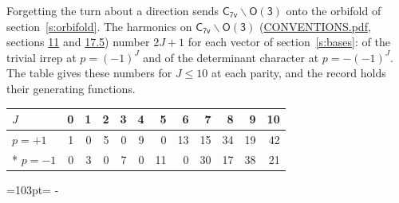 \documentclass[10pt,a4paper]{article}
\newcommand{\needspace}[1]{\par\penalty-100\begingroup\dimen0=#1\relax\dimen2=\pagegoal
  \advance\dimen2-\pagetotal\ifdim\dimen0>\dimen2\relax\ifdim\dimen2>0pt\vfil\break\fi\fi
  \endgroup}
\numberwithin{equation}{section}
\newcommand{\grp}[1]{\mathsf{#1}}
\begin{document}
Forgetting the turn about a direction sends $\grp{C_{7v}}\backslash\grp{O(3)}$ onto the orbifold of section~\ref{s:orbifold}.
The harmonics on $\grp{C_{7v}}\backslash\grp{O(3)}$ (\href{../../CONVENTIONS.pdf}{CONVENTIONS.pdf}, sections \href{../../CONVENTIONS.pdf\#conv.11}{11} and \href{../../CONVENTIONS.pdf\#conv.17.5}{17.5}) number $2J + 1$ for each vector of section~\ref{s:bases}: of the trivial irrep at $p = (-1)^J$ and of the determinant character at $p = -(-1)^J$. The table gives these numbers for $J \le 10$ at each parity, and the record holds their generating functions.
{\small\setlength{\tabcolsep}{4pt}\begin{longtable}{@{}lrrrrrrrrrrr@{}}\toprule
$J$ & 0 & 1 & 2 & 3 & 4 & 5 & 6 & 7 & 8 & 9 & 10\\\midrule\endhead
\bottomrule\endfoot\endlastfoot
$p = +1$ & 1 & 0 & 5 & 0 & 9 & 0 & 13 & 15 & 34 & 19 & 42\\*
$p = -1$ & 0 & 3 & 0 & 7 & 0 & 11 & 0 & 30 & 17 & 38 & 21\\
\bottomrule\end{longtable}}
\needspace{103pt}
\end{document}
